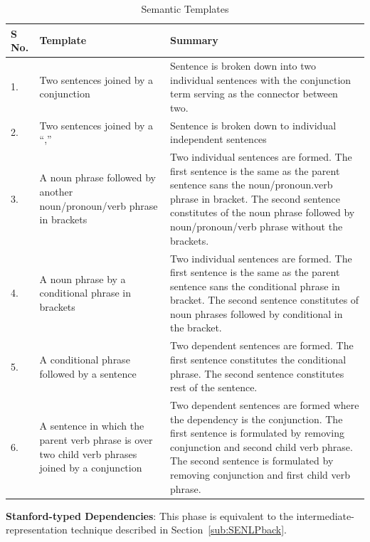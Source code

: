\begin{table}
\begin{center}

\caption{Semantic Templates}
    \begin{tabular}{ | l | p{5cm} |p{10cm} |}
    \hline
    \textbf{S No.} 	& \textbf{Template} & \textbf{Summary} \\ \hline
    
    1. 		& Two sentences joined by a conjunction & Sentence is broken down into two individual sentences with the conjunction term serving as the connector between two. \\ \hline
    2. 		& Two sentences joined by a ``,''& Sentence is broken down to individual independent sentences \\ \hline
    3.		& A noun phrase followed by another noun/pronoun/verb phrase in brackets & Two individual sentences are formed. The first sentence is  the same as the parent sentence sans the noun/pronoun.verb phrase in bracket. The second sentence constitutes of the noun phrase followed by  noun/pronoun/verb phrase without the brackets.\\ \hline
    4.		& A noun phrase by a conditional phrase in brackets & Two individual sentences are formed. The first sentence is the same as the parent sentence sans the conditional phrase in bracket. The second sentence constitutes of noun phrases followed by conditional in the bracket.\\ \hline
    5.		& A conditional phrase followed by a sentence & Two dependent sentences are formed. The first sentence constitutes the conditional phrase. The second sentence constitutes rest of the sentence.\\ \hline
    6.		& A sentence in which the parent verb phrase is over two child verb phrases joined by a conjunction & Two dependent sentences are formed where the dependency is the conjunction. The first sentence is formulated by removing conjunction and second child verb phrase. The second sentence is formulated by removing conjunction and first child verb phrase. \\ \hline
    \end{tabular}
	\label{tab:semanticTemplates}
\end{center}
\end{table}

\textbf{Stanford-typed Dependencies}: This phase is equivalent to the intermediate-representation technique described in Section~\ref{sub:SENLPback}.

